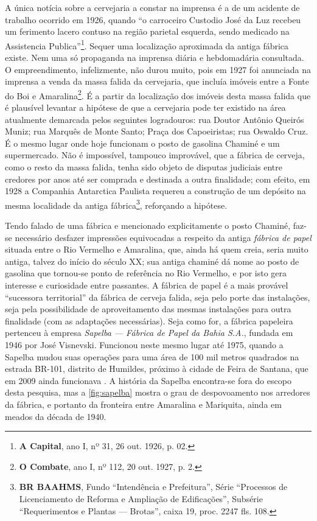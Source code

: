 A única notícia sobre a cervejaria a constar na imprensa é a de um acidente de trabalho ocorrido em 1926, quando ``o carroceiro Custodio José da Luz recebeu um ferimento lacero contuso na região parietal esquerda, sendo medicado na Assistencia Publica''\footnote{\textbf{A Capital}, ano I, nº 31, 26 out. 1926, p. 02.}. Sequer uma localização aproximada da antiga fábrica existe. Nem uma só propaganda na imprensa diária e hebdomadária consultada. O empreendimento, infelizmente, não durou muito, pois em 1927 foi anunciada na imprensa a venda da massa falida da cervejaria, que incluía imóveis entre a Fonte do Boi e Amaralina\footnote{\textbf{O Combate}, ano I, nº 112, 20 out. 1927, p. 2.}. É a partir da localização dos imóveis desta massa falida que é plausível levantar a hipótese de que a cervejaria pode ter existido na área atualmente demarcada pelos seguintes logradouros: rua Doutor Antônio Queirós Muniz; rua Marquês de Monte Santo; Praça dos Capoeiristas; rua Oswaldo Cruz. É o mesmo lugar onde hoje funcionam o posto de gasolina Chaminé e um supermercado. Não é impossível, tampouco improvável, que a fábrica de cerveja, como o resto da massa falida, tenha sido objeto de disputas judiciais entre credores por anos até ser comprada e destinada a outra finalidade; com efeito, em 1928 a Companhia Antarctica Paulista requereu a construção de um depósito na mesma localidade da antiga fábrica\footnote{\textbf{BR BAAHMS}, Fundo ``Intendência e Prefeitura'', Série ``Processos de Licenciamento de Reforma e Ampliação de Edificações'', Subsérie ``Requerimentos e Plantas --- Brotas'', caixa 19, proc. 2247 fls. 108.}, reforçando a hipótese.

Tendo falado de uma fábrica e mencionado explicitamente o posto Chaminé, faz-se necessário desfazer impressões equivocadas a respeito da antiga \textit{fábrica de papel} situada entre o Rio Vermelho e Amaralina, que, ainda há quem creia, seria muito antiga, talvez do início do século XX; sua antiga chaminé dá nome ao posto de gasolina que tornou-se ponto de referência no Rio Vermelho, e por isto gera interesse e curiosidade entre passantes. A fábrica de papel é a mais provável ``sucessora territorial'' da fábrica de cerveja falida, seja pelo porte das instalações, seja pela possibilidade de aproveitamento das mesmas instalações para outra finalidade (com as adaptações necessárias). Seja como for, a fábrica papeleira pertenceu à empresa \textit{Sapelba --- Fábrica de Papel da Bahia S.A.}, fundada em 1946 por José Visnevski. Funcionou neste mesmo lugar até 1975, quando a Sapelba mudou suas operações para uma área de 100 mil metros quadrados na estrada BR-101, distrito de Humildes, próximo à cidade de Feira de Santana, que em 2009 ainda funcionava \cite{sapelba_2015}. A história da Sapelba encontra-se fora do escopo desta pesquisa, mas a \autoref{fig:sapelba} mostra o grau de despovoamento nos arredores da fábrica, e portanto da fronteira entre Amaralina e Mariquita, ainda em meados da década de 1940.


